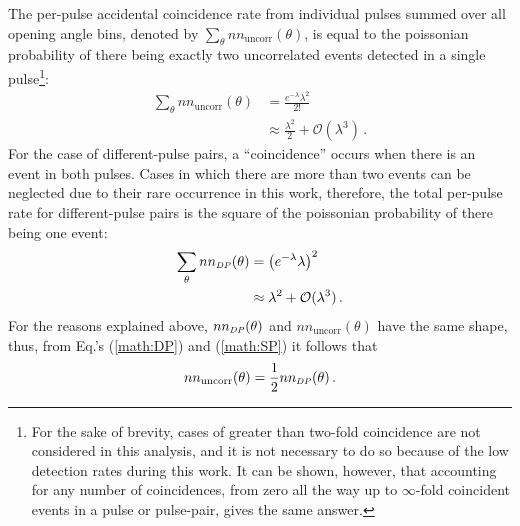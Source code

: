 The per-pulse accidental coincidence rate from individual pulses summed over all opening angle bins, denoted by $\sum_{\theta} nn_{\text{uncorr}}(\theta)$, is equal to the poissonian probability of there being exactly two uncorrelated events detected in a single pulse\footnote{For the sake of brevity, cases of greater than two-fold coincidence are not considered in this analysis, and it is not necessary to do so because of the low detection rates during this work. It can be shown, however, that accounting for any number of coincidences, from zero all the way up to $\infty$-fold coincident events in a pulse or pulse-pair, gives the same answer.}:
\begin{equation} \label{math:SP}
    \begin{split}
    \sum_{\theta} nn_{\text{uncorr}}(\theta) & = \frac{e^{-\lambda}\lambda^{2}}{2!} \\
        &\approx \frac{\lambda^2}{{2}} + \mathcal{O}(\lambda^3) \, .
    \end{split}
\end{equation}
For the case of different-pulse pairs, a ``coincidence'' occurs when there is an event in both pulses. Cases in which there are more than two events can be neglected due to their rare occurrence in this work, therefore, the total per-pulse rate for different-pulse pairs is the square of the poissonian probability of there being one event:
\begin{equation} \label{math:DP}
    \begin{split}
   \sum_{\theta} nn_{\scaleto{DP}{4pt}}(\theta)&= \left(e^{-\lambda}\lambda\right)^{2} \\
    &\approx \lambda^2 + \mathcal{O}(\lambda^3) \, .
    \end{split}
\end{equation}
For the reasons explained above, $nn_{\scaleto{DP}{4pt}}(\theta)$ and $nn_{\text{uncorr}}(\theta)$ have the same shape, thus, from Eq.'s (\ref{math:DP}) and (\ref{math:SP}) it follows that 
\begin{equation}
\label{eq:uncorr_DP}
nn_{\text{uncorr}}(\theta) = \frac{1}{2}nn_{\scaleto{DP}{4pt}}(\theta) \,.
\end{equation}

